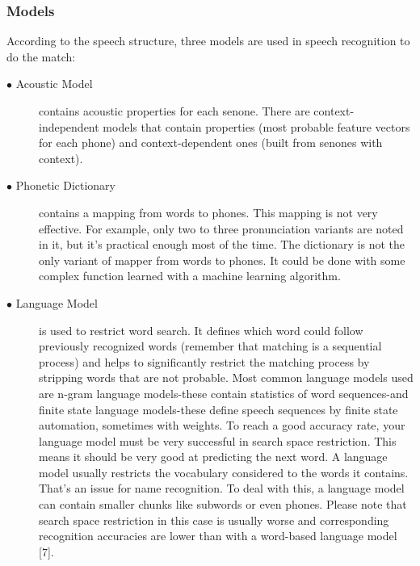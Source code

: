 \documentclass[12pt,a4paper,oneside]{memoir}
\begin{document}
\subsubsection{Models}
According to the speech structure, three models are used in speech recognition to do the match:
\begin{description}
  \item[$\bullet$ Acoustic Model] contains acoustic properties for each senone. There are context-independent models that contain properties (most probable feature vectors for each phone) and context-dependent ones (built from senones with context). 
  \item[$\bullet$ Phonetic Dictionary]
contains a mapping from words to phones. This mapping is not very effective. For example, only two to three pronunciation variants are noted in it, but it's practical enough most of the time. The dictionary is not the only variant of mapper from words to phones. It could be done with some complex function learned with a machine learning algorithm. 

  \item[$\bullet$ Language Model]
	is used to restrict word search. It defines which word could follow previously recognized words (remember that matching is a sequential process) and helps to significantly restrict the matching process by stripping words that are not probable. Most common language models used are n-gram language models-these contain statistics of word sequences-and finite state language models-these define speech sequences by finite state automation, sometimes with weights. To reach a good accuracy rate, your language model must be very successful in search space restriction. This means it should be very good at predicting the next word. A language model usually restricts the vocabulary considered to the words it contains. That's an issue for name recognition. To deal with this, a language model can contain smaller chunks like subwords or even phones. Please note that search space restriction in this case is usually worse and corresponding recognition accuracies are lower than with a word-based language model [7].

\end{description}
\end{document}
